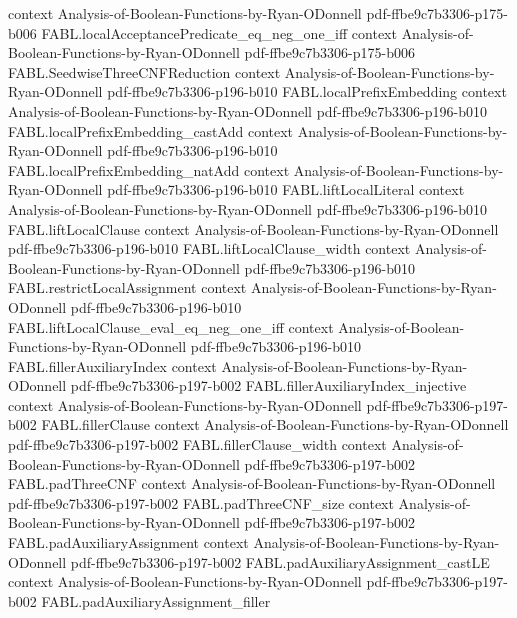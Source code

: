 \begin{theorem}
  {context}
  {Analysis-of-Boolean-Functions-by-Ryan-ODonnell}
  {pdf-ffbe9c7b3306-p175-b006}
\proofstep
  {FABL.localAcceptancePredicate_eq_neg_one_iff}
  {context}
  {Analysis-of-Boolean-Functions-by-Ryan-ODonnell}
  {pdf-ffbe9c7b3306-p175-b006}
\proofstep
  {FABL.SeedwiseThreeCNFReduction}
  {context}
  {Analysis-of-Boolean-Functions-by-Ryan-ODonnell}
  {pdf-ffbe9c7b3306-p196-b010}
\proofstep
  {FABL.localPrefixEmbedding}
  {context}
  {Analysis-of-Boolean-Functions-by-Ryan-ODonnell}
  {pdf-ffbe9c7b3306-p196-b010}
\proofstep
  {FABL.localPrefixEmbedding_castAdd}
  {context}
  {Analysis-of-Boolean-Functions-by-Ryan-ODonnell}
  {pdf-ffbe9c7b3306-p196-b010}
\proofstep
  {FABL.localPrefixEmbedding_natAdd}
  {context}
  {Analysis-of-Boolean-Functions-by-Ryan-ODonnell}
  {pdf-ffbe9c7b3306-p196-b010}
\proofstep
  {FABL.liftLocalLiteral}
  {context}
  {Analysis-of-Boolean-Functions-by-Ryan-ODonnell}
  {pdf-ffbe9c7b3306-p196-b010}
\proofstep
  {FABL.liftLocalClause}
  {context}
  {Analysis-of-Boolean-Functions-by-Ryan-ODonnell}
  {pdf-ffbe9c7b3306-p196-b010}
\proofstep
  {FABL.liftLocalClause_width}
  {context}
  {Analysis-of-Boolean-Functions-by-Ryan-ODonnell}
  {pdf-ffbe9c7b3306-p196-b010}
\proofstep
  {FABL.restrictLocalAssignment}
  {context}
  {Analysis-of-Boolean-Functions-by-Ryan-ODonnell}
  {pdf-ffbe9c7b3306-p196-b010}
\proofstep
  {FABL.liftLocalClause_eval_eq_neg_one_iff}
  {context}
  {Analysis-of-Boolean-Functions-by-Ryan-ODonnell}
  {pdf-ffbe9c7b3306-p196-b010}
\proofstep
  {FABL.fillerAuxiliaryIndex}
  {context}
  {Analysis-of-Boolean-Functions-by-Ryan-ODonnell}
  {pdf-ffbe9c7b3306-p197-b002}
\proofstep
  {FABL.fillerAuxiliaryIndex_injective}
  {context}
  {Analysis-of-Boolean-Functions-by-Ryan-ODonnell}
  {pdf-ffbe9c7b3306-p197-b002}
\proofstep
  {FABL.fillerClause}
  {context}
  {Analysis-of-Boolean-Functions-by-Ryan-ODonnell}
  {pdf-ffbe9c7b3306-p197-b002}
\proofstep
  {FABL.fillerClause_width}
  {context}
  {Analysis-of-Boolean-Functions-by-Ryan-ODonnell}
  {pdf-ffbe9c7b3306-p197-b002}
\proofstep
  {FABL.padThreeCNF}
  {context}
  {Analysis-of-Boolean-Functions-by-Ryan-ODonnell}
  {pdf-ffbe9c7b3306-p197-b002}
\proofstep
  {FABL.padThreeCNF_size}
  {context}
  {Analysis-of-Boolean-Functions-by-Ryan-ODonnell}
  {pdf-ffbe9c7b3306-p197-b002}
\proofstep
  {FABL.padAuxiliaryAssignment}
  {context}
  {Analysis-of-Boolean-Functions-by-Ryan-ODonnell}
  {pdf-ffbe9c7b3306-p197-b002}
\proofstep
  {FABL.padAuxiliaryAssignment_castLE}
  {context}
  {Analysis-of-Boolean-Functions-by-Ryan-ODonnell}
  {pdf-ffbe9c7b3306-p197-b002}
\proofstep
  {FABL.padAuxiliaryAssignment_filler}

\end{theorem}
